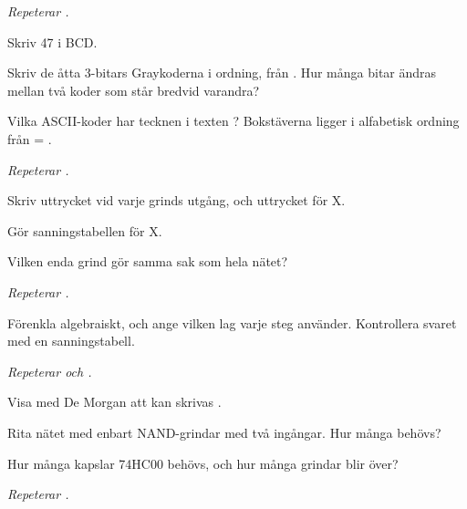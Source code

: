 \label{c12:ex:3}
\emph{Repeterar .}
\begin{parts}
  \item Skriv 47 i BCD.
  \item Skriv de åtta 3-bitars Graykoderna i ordning, från . Hur många bitar ändras mellan
    två koder som står bredvid varandra?
  \item Vilka ASCII-koder har tecknen i texten ? Bokstäverna ligger i alfabetisk ordning
    från  = .
\end{parts}

\label{c12:ex:4}
\emph{Repeterar .}


\begin{parts}
  \item Skriv uttrycket vid varje grinds utgång, och uttrycket för X.
  \item Gör sanningstabellen för X.
  \item Vilken enda grind gör samma sak som hela nätet?
\end{parts}

\label{c12:ex:5}
\emph{Repeterar .}

Förenkla algebraiskt, och ange vilken lag varje steg använder. Kontrollera svaret med en
sanningstabell.
\begin{parts}
  \item {}
  \item {}
\end{parts}

\label{c12:ex:6}
\emph{Repeterar  och .}
\begin{parts}
  \item Visa med De Morgan att  kan skrivas .
  \item Rita nätet med enbart NAND-grindar med två ingångar. Hur många behövs?
  \item Hur många kapslar 74HC00 behövs, och hur många grindar blir över?
\end{parts}

\label{c12:ex:7}
\emph{Repeterar .}

